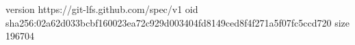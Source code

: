 version https://git-lfs.github.com/spec/v1
oid sha256:02a62d033bcbf160023ea72c929d003404fd8149ced8f4f271a5f07fc5ccd720
size 196704
